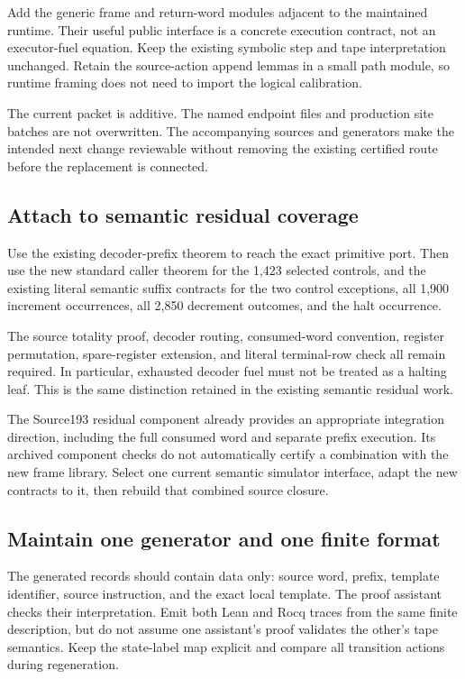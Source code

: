 \documentclass[11pt]{article}
\theoremstyle{definition}\newtheorem{definition}[theorem]{Definition}
\theoremstyle{remark}\newtheorem{remark}[theorem]{Remark}
\begin{document}
Add the generic frame and return-word modules adjacent to the maintained runtime. Their useful public interface is a concrete execution contract, not an executor-fuel equation. Keep the existing symbolic step and tape interpretation unchanged. Retain the source-action append lemmas in a small path module, so runtime framing does not need to import the logical calibration.

The current packet is additive. The named endpoint files and production site batches are not overwritten. The accompanying sources and generators make the intended next change reviewable without removing the existing certified route before the replacement is connected.

\subsection{Attach to semantic residual coverage}

Use the existing decoder-prefix theorem to reach the exact primitive port. Then use the new standard caller theorem for the 1,423 selected controls, and the existing literal semantic suffix contracts for the two control exceptions, all 1,900 increment occurrences, all 2,850 decrement outcomes, and the halt occurrence.

The source totality proof, decoder routing, consumed-word convention, register permutation, spare-register extension, and literal terminal-row check all remain required. In particular, exhausted decoder fuel must not be treated as a halting leaf. This is the same distinction retained in the existing semantic residual work.

The Source193 residual component already provides an appropriate integration direction, including the full consumed word and separate prefix execution. Its archived component checks do not automatically certify a combination with the new frame library. Select one current semantic simulator interface, adapt the new contracts to it, then rebuild that combined source closure.

\subsection{Maintain one generator and one finite format}

The generated records should contain data only: source word, prefix, template identifier, source instruction, and the exact local template. The proof assistant checks their interpretation. Emit both Lean and Rocq traces from the same finite description, but do not assume one assistant's proof validates the other's tape semantics. Keep the state-label map explicit and compare all transition actions during regeneration.
\end{document}
